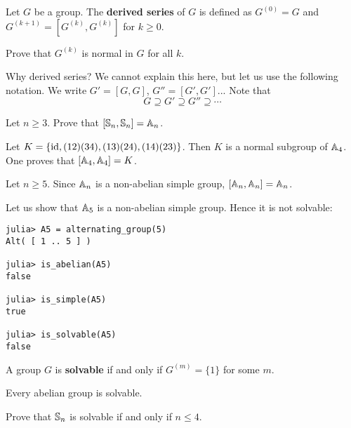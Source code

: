\begin{definition}
    Let $G$ be a group. The \textbf{derived series} of $G$ 
    is defined as $G^{(0)}=G$ and
    $G^{(k+1)}=[G^{(k)},G^{(k)}]$ for $k\geq 0$. 
\end{definition}

\begin{exercise}
    Prove that $G^{(k)}$ is normal in $G$ for all $k$. 
\end{exercise}

Why derived series? We cannot explain this here, but let us use the following
notation. 
We write $G'=[G,G]$, $G''=[G',G']$... 
Note that 
\[
G\supseteq G'\supseteq G''\supseteq\cdots
\]


\begin{exercise}
    Let $n\geq3$. Prove that 
    $[\mathbb{S}_n,\mathbb{S}_n]=\mathbb{A}_n$. 
\end{exercise}

\begin{example}
    Let $K=\{\operatorname{id},(12)(34),(13)(24),(14)(23)\}$. Then 
    $K$ is a normal subgroup of $\mathbb{A}_4$. 
    One proves that $[\mathbb{A}_4,\mathbb{A}_4]=K$. 
\end{example}

\begin{example}
    Let $n\geq5$. Since $\mathbb{A}_n$ is a non-abelian simple group, 
    $[\mathbb{A}_n,\mathbb{A}_n]=\mathbb{A}_n$. 
\end{example}

Let us show that $\mathbb{A}_5$ is a non-abelian simple group. Hence
it is not solvable: 
\begin{lstlisting}
julia> A5 = alternating_group(5)
Alt( [ 1 .. 5 ] )

julia> is_abelian(A5)
false

julia> is_simple(A5)
true

julia> is_solvable(A5)
false
\end{lstlisting}

\begin{definition}
    A group $G$ is \textbf{solvable} if and only if
    $G^{(m)}=\{1\}$ for some $m$. 
\end{definition}

Every abelian group is solvable. 

\begin{exercise}
    Prove that $\mathbb{S}_n$ is solvable if and only if $n\leq4$. 
\end{exercise}

